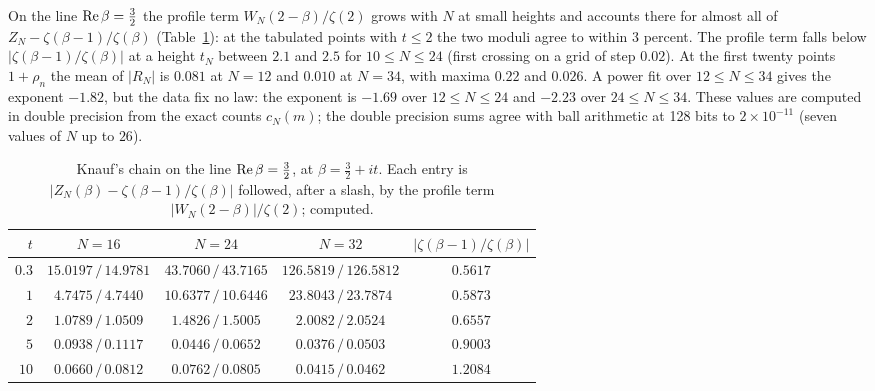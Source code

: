 On the line $\operatorname{Re}\beta=\frac32$ the profile term $W_N(2-\beta)/\zeta(2)$ grows with $N$ at small heights and accounts there for almost all of $Z_N-\zeta(\beta-1)/\zeta(\beta)$ (Table~\ref{fm:tab:perron}): at the tabulated points with $t\le2$ the two moduli agree to within 3 percent. The profile term falls below $|\zeta(\beta-1)/\zeta(\beta)|$ at a height $t_N$ between $2.1$ and $2.5$ for $10\le N\le24$ (first crossing on a grid of step $0.02$). At the first twenty points $1+\rho_n$ the mean of $|R_N|$ is $0.081$ at $N=12$ and $0.010$ at $N=34$, with maxima $0.22$ and $0.026$. A power fit over $12\le N\le34$ gives the exponent $-1.82$, but the data fix no law: the exponent is $-1.69$ over $12\le N\le24$ and $-2.23$ over $24\le N\le34$. These values are computed in double precision from the exact counts $c_N(m)$; the double precision sums agree with ball arithmetic at 128 bits to $2\times10^{-11}$ (seven values of $N$ up to $26$).

\begin{table}[t]
\centering\small
\begin{tabular}{rcccc}
\toprule
$t$ & $N=16$ & $N=24$ & $N=32$ & $|\zeta(\beta-1)/\zeta(\beta)|$\\
\midrule
$0.3$ & $15.0197\,/\,14.9781$ & $43.7060\,/\,43.7165$ & $126.5819\,/\,126.5812$ & $0.5617$\\
$1$ & $4.7475\,/\,4.7440$ & $10.6377\,/\,10.6446$ & $23.8043\,/\,23.7874$ & $0.5873$\\
$2$ & $1.0789\,/\,1.0509$ & $1.4826\,/\,1.5005$ & $2.0082\,/\,2.0524$ & $0.6557$\\
$5$ & $0.0938\,/\,0.1117$ & $0.0446\,/\,0.0652$ & $0.0376\,/\,0.0503$ & $0.9003$\\
$10$ & $0.0660\,/\,0.0812$ & $0.0762\,/\,0.0805$ & $0.0415\,/\,0.0462$ & $1.2084$\\
\bottomrule
\end{tabular}
\caption{Knauf's chain on the line $\operatorname{Re}\beta=\frac32$, at $\beta=\frac32+it$. Each entry is $|Z_N(\beta)-\zeta(\beta-1)/\zeta(\beta)|$ followed, after a slash, by the profile term $|W_N(2-\beta)|/\zeta(2)$; computed.}
\label{fm:tab:perron}
\end{table}


